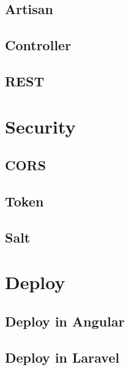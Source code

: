 \subsection{Artisan}

\subsection{Controller}

\subsection{REST}




\section{Security}

\subsection{CORS}

\subsection{Token}

\subsection{Salt}


\section{Deploy}

\subsection{Deploy in Angular}
\subsection{Deploy in Laravel}
